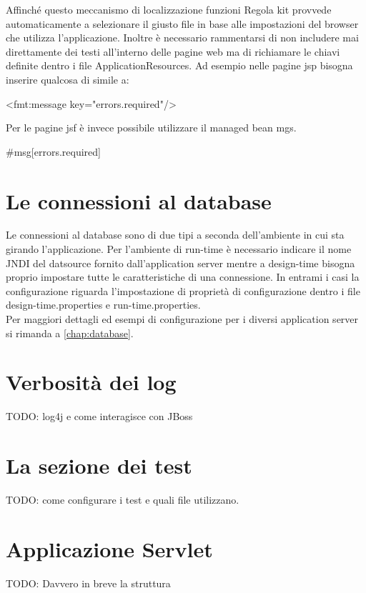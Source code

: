 Affinché questo meccanismo di localizzazione funzioni Regola kit provvede automaticamente a selezionare il giusto file in base alle impostazioni del browser che utilizza l'applicazione. Inoltre è necessario rammentarsi di non includere mai direttamente dei testi all'interno delle pagine web ma di richiamare le chiavi definite dentro i file ApplicationResources. Ad esempio nelle pagine jsp  bisogna inserire qualcosa di simile a:

\begin{java}
  <fmt:message key="errors.required"/>
\end{java}

Per le pagine jsf è invece possibile utilizzare il managed bean mgs.

\begin{java}
  #{msg[errors.required]}
\end{java}


\section{Le connessioni al database}
Le connessioni al database sono di due tipi a seconda dell'ambiente in cui sta girando l'applicazione. Per l'ambiente di run-time è necessario indicare il nome JNDI del datsource fornito dall'application server mentre a design-time bisogna proprio impostare tutte le caratteristiche di una connessione. In entrami i casi la configurazione riguarda l'impostazione di proprietà di configurazione dentro i file design-time.properties e run-time.properties. \\
Per maggiori dettagli ed esempi di configurazione per i diversi application server si rimanda a \vref{chap:database}.


\section{Verbosità dei log}
TODO: log4j e come interagisce con JBoss

\section{La sezione dei test}
TODO: come configurare i test e quali file utilizzano.

\section{Applicazione Servlet}
TODO: Davvero in breve la struttura